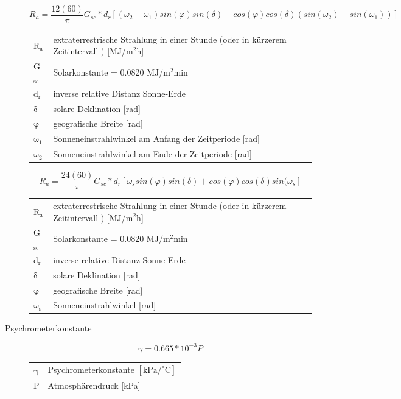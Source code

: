 \begin{description}
\begin{equation}
\label{eq:Ra_short_period}
R_{a}=\frac{12 (60)}{\pi}G_{sc}*d_{r}[(\omega _{2}-\omega _{1})sin(\varphi)sin(\delta)+cos(\varphi)cos(\delta)(sin(\omega _{2})- sin(\omega _{1}))]
\end{equation}
\begin{table}[H]
\centering
\begin{tabular}{ll}
R$\mathrm{_{a}}$ & extraterrestrische Strahlung in einer Stunde (oder in kürzerem Zeitintervall ) [MJ/m$\mathrm{^{2}}$h]\\
G$\mathrm{_{sc}}$ & Solarkonstante = 0.0820 MJ/m$\mathrm{^{2}}$min\\
d$\mathrm{_{r}}$ & inverse relative Distanz Sonne-Erde\\
$\mathrm{\delta}$ & solare Deklination [rad]\\
$\mathrm{\varphi}$ & geografische Breite [rad]\\
$\mathrm{\omega_{1}}$ & Sonneneinstrahlwinkel am Anfang der Zeitperiode [rad]\\
$\mathrm{\omega_{2}}$ & Sonneneinstrahlwinkel am Ende der Zeitperiode [rad]\\
\end{tabular}
\end{table}

\begin{equation}
\label{eq:Ra_long_period}
R_{a}=\frac{24 (60)}{\pi}G_{sc}*d_{r}[\omega _{s}sin(\varphi)sin(\delta)+cos(\varphi)cos(\delta)sin(\omega _{s}]
\end{equation}
\begin{table}[H]
\centering
\begin{tabular}{ll}
R$\mathrm{_{a}}$ & extraterrestrische Strahlung in einer Stunde (oder in kürzerem Zeitintervall ) [MJ/m$\mathrm{^{2}}$h]\\
G$\mathrm{_{sc}}$ & Solarkonstante = 0.0820 MJ/m$\mathrm{^{2}}$min\\
d$\mathrm{_{r}}$ & inverse relative Distanz Sonne-Erde\\
$\mathrm{\delta}$ & solare Deklination [rad]\\
$\mathrm{\varphi}$ & geografische Breite [rad]\\
$\mathrm{\omega_{s}}$ & Sonneneinstrahlwinkel [rad]\\
\end{tabular}
\end{table}



\item[Psychrometerkonstante]
\begin{equation}
\label{eq:gamma}
\gamma=0.665*10^{-3} P
\end{equation}
\begin{table}[H]
\centering
\begin{tabular}{ll}
$\mathrm{\gamma}$ & Psychrometerkonstante $\mathrm{[kPa/^{\circ}C]}$\\
P & Atmosphärendruck [kPa]\\
\end{tabular}
\end{table}


\end{description}
